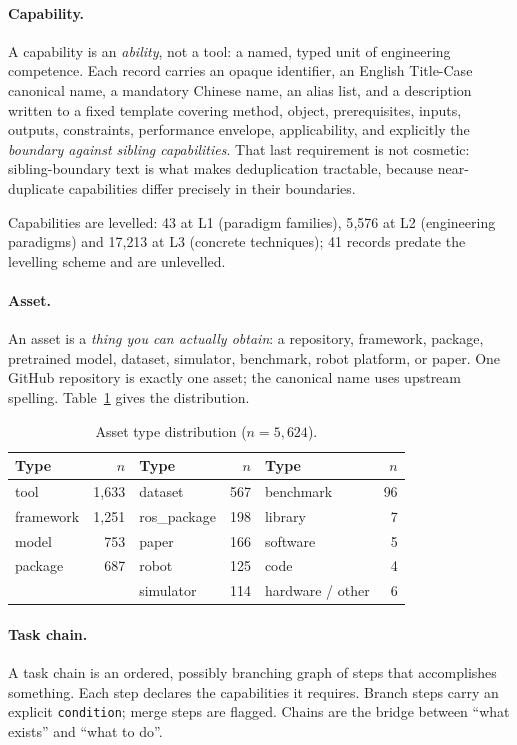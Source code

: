 \documentclass[10pt,a4paper]{article}
\begin{document}
\paragraph{Capability.} A capability is an \emph{ability}, not a tool: a named,
typed unit of engineering competence. Each record carries an opaque identifier,
an English Title-Case canonical name, a mandatory Chinese name, an alias list,
and a description written to a fixed template covering method, object,
prerequisites, inputs, outputs, constraints, performance envelope, applicability,
and explicitly the \emph{boundary against sibling capabilities}. That last
requirement is not cosmetic: sibling-boundary text is what makes deduplication
tractable, because near-duplicate capabilities differ precisely in their
boundaries.

Capabilities are levelled: 43 at L1 (paradigm families), 5{,}576 at L2
(engineering paradigms) and 17{,}213 at L3 (concrete techniques); 41 records
predate the levelling scheme and are unlevelled.

\paragraph{Asset.} An asset is a \emph{thing you can actually obtain}: a
repository, framework, package, pretrained model, dataset, simulator, benchmark,
robot platform, or paper. One GitHub repository is exactly one asset; the
canonical name uses upstream spelling. Table~\ref{tab:assettypes} gives the
distribution.

\begin{table}[htbp]
\centering\small
\caption{Asset type distribution ($n=5{,}624$).}
\label{tab:assettypes}
\begin{tabular}{@{}lr lr lr@{}}
\toprule
Type & $n$ & Type & $n$ & Type & $n$ \\
\midrule
tool         & 1{,}633 & dataset     & 567 & benchmark & 96 \\
framework    & 1{,}251 & ros\_package & 198 & library   & 7 \\
model        & 753 & paper       & 166 & software  & 5 \\
package      & 687 & robot       & 125 & code      & 4 \\
             &     & simulator   & 114 & hardware / other & 6 \\
\bottomrule
\end{tabular}
\end{table}

\paragraph{Task chain.} A task chain is an ordered, possibly branching graph of
steps that accomplishes something. Each step declares the capabilities it
requires. Branch steps carry an explicit \texttt{condition}; merge steps are
flagged. Chains are the bridge between ``what exists'' and ``what to do''.
\end{document}
